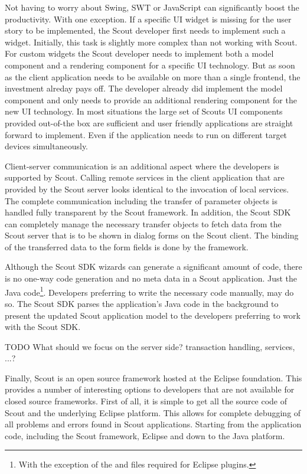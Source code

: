 \documentclass[a4paper,10pt,twoside]{book}
\begin{document}
Not having to worry about Swing, SWT or JavaScript can significantly boost the productivity.
With one exception. 
If a specific UI widget is missing for the user story to be implemented, the Scout developer first needs to implement such a widget. 
Initially, this task is slightly more complex than not working with Scout. 
For custom widgets the Scout developer needs to implement both a model component and a rendering component for a specific UI technology. 
But as soon as the client application needs to be available on more than a single frontend, the investment alreday pays off.
The developer already did implement the model component and only needs to provide an additional rendering component for the new UI technology.
In most situations the large set of Scouts UI components provided out-of-the box are sufficient and user friendly applications are straight forward to implement. 
Even if the application needs to run on different target devices simultaneously.

Client-server communication is an additional aspect where the developers is supported by Scout.
Calling remote services in the client application that are provided by the Scout server looks identical to the invocation of local services. 
The complete communication including the transfer of parameter objects is handled fully transparent by the Scout framework.
In addition, the Scout SDK can completely manage the necessary transfer objects to fetch data from the Scout server that is to be shown in dialog forms on the Scout client.
The binding of the transferred data to the form fields is done by the framework.

Although the Scout SDK wizards can generate a significant amount of code, there is no one-way code generation and no meta data in a Scout application.
Just the Java code\footnote{
With the exception of the  and  files required for Eclipse plugins.
}. 
Developers preferring to write the necessary code manually, may do so. 
The Scout SDK parses the application's Java code in the background to present the updated Scout application model to the developers preferring to work with the Scout SDK. 

TODO What should we focus on the server side? transaction handling, services, ...? 

Finally, Scout is an open source framework hosted at the Eclipse foundation. 
This provides a number of interesting options to developers that are not available for closed source frameworks. 
First of all, it is simple to get all the source code of Scout and the underlying Eclipse platform. 
This allows for complete debugging of all problems and errors found in Scout applications. 
Starting from the application code, including the Scout framework, Eclipse and down to the Java platform. 
\end{document}
